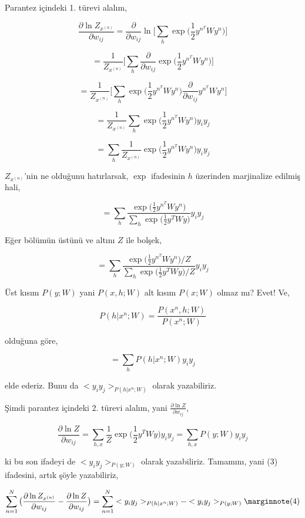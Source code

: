 \documentclass[12pt,fleqn]{article}\usepackage{../../common}
\begin{document}
Parantez içindeki 1. türevi alalım,

$$ 
\frac{\partial \ln Z_{x^{(n)}} }{\partial w_{ij}} = 
\frac{\partial }{\partial w_{ij}}  
\ln \bigg[ 
\sum_h \exp \big( \frac{1}{2} y^{n^T} W y^n \big) 
\bigg]
$$

$$ 
= \frac{1}{Z_{x^{(n)}}}  \bigg[ \sum_h \frac{\partial }{\partial w_{ij}} \exp \big( \frac{1}{2} y^{n^T} W y^n  \big) \bigg]
$$

$$ 
= \frac{1}{Z_{x^{(n)}}}  
\bigg[ 
\sum_h  \exp \big( \frac{1}{2} y^{n^T} W y^n  \big) 
\frac{\partial }{\partial w_{ij}} y^{n^T} W y^n 
\bigg]
$$

$$ 
= \frac{1}{Z_{x^{(n)}}}  \sum_h  \exp \big( \frac{1}{2} y^{n^T} W y^n  \big) y_iy_j
$$

$$ 
= \sum_h  \frac{1}{Z_{x^{(n)}}}  \exp \big( \frac{1}{2} y^{n^T} W y^n  \big) y_iy_j
$$

$Z_{x^{(n)}}$'nin ne olduğunu hatırlarsak, $\exp$ ifadesinin $h$ üzerinden
marjinalize edilmiş hali,

$$ 
= \sum_h  \frac{\exp \big( \frac{1}{2} y^{n^T} W y^n  \big)}
{\sum_h \exp \big( \frac{1}{2} y^T W y \big) } 
y_iy_j
$$

Eğer bölümün üstünü ve altını $Z$ ile bolşek,

$$ 
= \sum_h  
\frac{\exp \big( \frac{1}{2} y^{n^T} W y^n  \big) / Z} 
{\sum_h \exp \big( \frac{1}{2} y^T W y \big) / Z} 
y_iy_j
$$

Üst kısım $P(y;W)$ yani $P(x,h;W) $ alt kısım $P(x;W)$ olmaz mı? Evet! Ve,

$$ P(h|x^n;W) = \frac{P(x^n,h;W)}{P(x^n;W)}  $$

olduğuna göre, 

$$ =  \sum_h P(h|x^n;W) y_iy_j $$

elde ederiz. Bunu da $<y_iy_j>_{P(h|x^n;W)}$ olarak yazabiliriz. 

Şimdi parantez içindeki 2. türevi alalım, yani $\frac{\partial \ln Z }{\partial w_{ij}} $,

$$ 
\frac{\partial \ln Z }{\partial w_{ij}}  = 
\sum_{h,x} \frac{1}{Z}  \exp \big( \frac{1}{2} y^{T} W y  \big) y_iy_j =
\sum_{h,x} P(y;W)  y_iy_j
$$

ki bu son ifadeyi de $< y_iy_j >_{P(y;W)}$ olarak yazabiliriz. Tamamını,
yani (3) ifadesini, artık şöyle yazabiliriz,

$$
\sum_{n=1}^{N}  \big( \frac{\partial \ln Z_{x^{(n)}} }{\partial w_{ij}} - 
\frac{\partial \ln Z }{\partial w_{ij}} \big)
= \sum_{n=1}^{N}  < y_iy_j >_{P(h|x^n;W)} - < y_iy_j >_{P(y;W)}
\mlabel{4}
$$
\end{document}
